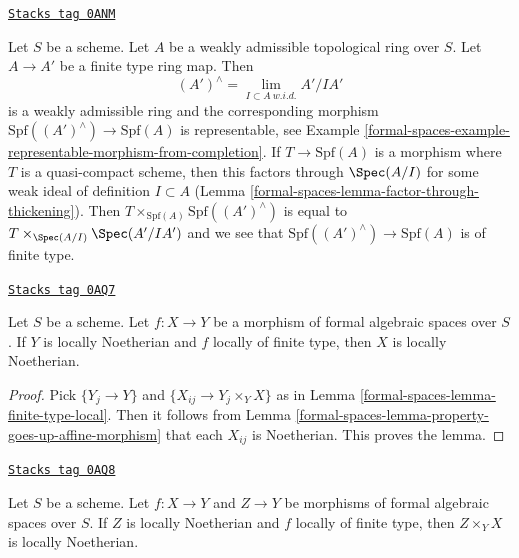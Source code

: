 \begin{example}
\label{formal-spaces-example-finite-type-from-finite-type-ring-map}
\href{https://stacks.math.columbia.edu/tag/0ANM}{\texttt{Stacks tag 0ANM}}

Let $S$ be a scheme. Let $A$ be a weakly admissible topological ring over $S$.
Let $A \to A'$ be a finite type ring map. Then
$$
(A')^\wedge = \lim_{I \subset A\ w.i.d.} A'/IA'
$$
is a weakly admissible ring and the corresponding morphism
$\text{Spf}((A')^\wedge) \to \text{Spf}(A)$ is representable,
see Example \ref{formal-spaces-example-representable-morphism-from-completion}.
If $T \to \text{Spf}(A)$ is a morphism where $T$ is a quasi-compact
scheme, then this factors through $\Spec(A/I)$ for some weak
ideal of definition $I \subset A$ (Lemma \ref{formal-spaces-lemma-factor-through-thickening}).
Then $T \times_{\text{Spf}(A)} \text{Spf}((A')^\wedge)$
is equal to $T \times_{\Spec(A/I)} \Spec(A'/IA')$ and
we see that $\text{Spf}((A')^\wedge) \to \text{Spf}(A)$ is
of finite type.
\end{example}

\begin{lemma}
\label{formal-spaces-lemma-locally-finite-type-locally-noetherian}
\href{https://stacks.math.columbia.edu/tag/0AQ7}{\texttt{Stacks tag 0AQ7}}

Let $S$ be a scheme. Let $f : X \to Y$ be a morphism of
formal algebraic spaces over $S$. If $Y$ is locally Noetherian and
$f$ locally of finite type, then $X$ is locally Noetherian.
\end{lemma}

\begin{proof}
Pick $\{Y_j \to Y\}$ and $\{X_{ij} \to Y_j \times_Y X\}$
as in Lemma \ref{formal-spaces-lemma-finite-type-local}. Then it follows
from Lemma \ref{formal-spaces-lemma-property-goes-up-affine-morphism}
that each $X_{ij}$ is Noetherian. This proves the lemma.
\end{proof}

\begin{lemma}
\label{formal-spaces-lemma-fibre-product-Noetherian}
\href{https://stacks.math.columbia.edu/tag/0AQ8}{\texttt{Stacks tag 0AQ8}}

Let $S$ be a scheme. Let $f : X \to Y$ and $Z \to Y$ be morphisms
of formal algebraic spaces over $S$. If $Z$ is locally
Noetherian and $f$ locally of finite type, then
$Z \times_Y X$ is locally Noetherian.
\end{lemma}

